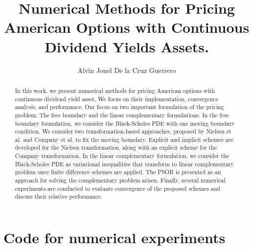 \documentclass{uonmathreport}
\title{Numerical Methods for Pricing American Options with Continuous Dividend Yields Assets.}
\author{Alvin Jonel De la Cruz Guerrero}
\begin{document}
\maketitle

\begin{abstract}
  In this work, we present numerical methods for pricing American options with continuous dividend yield asset. We focus on their implementation, convergence analysis, and performance. Our focus on two important formulation of the pricing problem: The free boundary and the linear complementary formulations. In the free boundary formulation, we consider the Black-Scholes PDE with one moving boundary condition. We consider two transformation-based approaches, proposed by Nielsen et al. and Company et al. to fix the moving boundary. Explicit and implicit schemes are developed for the Nielsen transformation, along with an explicit scheme for the Company transformation.
  In the linear complementary formulation, we consider the Black-Scholes PDE as variational inequalities that transform to linear complementary problem once finite difference schemes are applied. The PSOR is presented as an approach for solving the complementary problem arisen. Finally, several numerical experiments are conducted to evaluate convergence of the proposed schemes and discuss their relative performance.
\end{abstract}

\setcounter{tocdepth}{3}  %
\tableofcontents 
\newpage
{}




% 


% 
\newpage

\appendix


\section{Code for numerical experiments} \label{sec:numericalexperiments}
\end{document}
